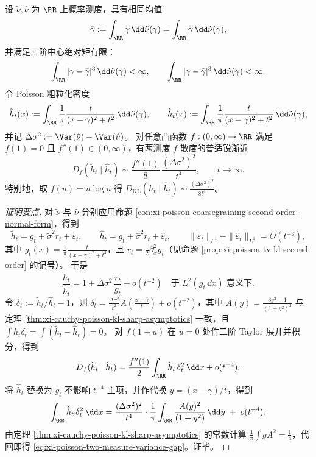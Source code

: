 \begin{theorem}\label{thm:xi-poisson-two-measure-variance-gap}
设 \(\tilde\nu,\hat\nu\) 为 \(\RR\) 上概率测度，具有相同均值
\[
\bar\gamma:=\int_{\RR}\gamma\,\dd\tilde\nu(\gamma)=\int_{\RR}\gamma\,\dd\hat\nu(\gamma),
\]
并满足三阶中心绝对矩有限：
\[
\int_{\RR}|\gamma-\bar\gamma|^3\,\dd\tilde\nu(\gamma)<\infty,
\qquad
\int_{\RR}|\gamma-\bar\gamma|^3\,\dd\hat\nu(\gamma)<\infty.
\]
令 Poisson 粗粒化密度
\[
\tilde h_t(x):=\int_{\RR}\frac{1}{\pi}\frac{t}{(x-\gamma)^2+t^2}\,\dd\tilde\nu(\gamma),
\qquad
\hat h_t(x):=\int_{\RR}\frac{1}{\pi}\frac{t}{(x-\gamma)^2+t^2}\,\dd\hat\nu(\gamma),
\]
并记
\(
\Delta\sigma^2:=\Var(\tilde\nu)-\Var(\hat\nu)
\)。
对任意凸函数 \(f:(0,\infty)\to\RR\) 满足 \(f(1)=0\) 且 \(f''(1)\in(0,\infty)\)，有两测度 \texorpdfstring{$f$}{f}-散度的普适锐渐近
\begin{equation}\label{eq:xi-poisson-two-measure-variance-gap}
\boxed{\;
D_f(\tilde h_t\mid \hat h_t)\sim \frac{f''(1)}{8}\,\frac{(\Delta\sigma^2)^2}{t^4},
\qquad t\to\infty.\;}
\end{equation}
特别地，取 \(f(u)=u\log u\) 得
\(
D_{\mathrm{KL}}(\tilde h_t\mid \hat h_t)\sim \frac{(\Delta\sigma^2)^2}{8t^4}
\)。
\end{theorem}
\begin{proof}[证明要点]
对 \(\tilde\nu\) 与 \(\hat\nu\) 分别应用命题 \ref{con:xi-poisson-coarsegraining-second-order-normal-form}，得到
\[
\tilde h_t=g_t+\tilde\sigma^2 r_t+\tilde\varepsilon_t,
\qquad
\hat h_t=g_t+\hat\sigma^2 r_t+\hat\varepsilon_t,
\qquad
\|\tilde\varepsilon_t\|_{L^1}+\|\hat\varepsilon_t\|_{L^1}=O(t^{-3}),
\]
其中 \(g_t(x)=\frac{1}{\pi}\frac{t}{(x-\bar\gamma)^2+t^2}\)，且 \(r_t=\tfrac12\partial_x^2 g_t\)（见命题 \ref{prop:xi-poisson-tv-kl-second-order} 的记号）。
于是
\[
\frac{\tilde h_t}{\hat h_t}
=1+\Delta\sigma^2\,\frac{r_t}{g_t}+o(t^{-2})
\quad\text{于 }L^2(g_t\,\dd x)\text{ 意义下}.
\]
令 \(\delta_t:=\tilde h_t/\hat h_t-1\)，则 \(\delta_t=\frac{\Delta\sigma^2}{t^2}A\!\left(\frac{x-\bar\gamma}{t}\right)+o(t^{-2})\)，其中
\(
A(y)=\frac{3y^2-1}{(1+y^2)^2}
\)
与定理 \ref{thm:xi-cauchy-poisson-kl-sharp-asymptotics} 一致，且 \(\int \hat h_t\delta_t=\int(\tilde h_t-\hat h_t)=0\)。
对 \(f(1+u)\) 在 \(u=0\) 处作二阶 Taylor 展开并积分，得到
\[
D_f(\tilde h_t\mid \hat h_t)
=\frac{f''(1)}{2}\int_{\RR}\hat h_t\,\delta_t^2\,\dd x+o(t^{-4}).
\]
将 \(\hat h_t\) 替换为 \(g_t\) 不影响 \(t^{-4}\) 主项，并作代换 \(y=(x-\bar\gamma)/t\)，得到
\[
\int_{\RR}\hat h_t\,\delta_t^2\,\dd x
=\frac{(\Delta\sigma^2)^2}{t^4}\cdot \frac{1}{\pi}\int_{\RR}\frac{A(y)^2}{(1+y^2)}\,\dd y
\;+\;o(t^{-4}).
\]
由定理 \ref{thm:xi-cauchy-poisson-kl-sharp-asymptotics} 的常数计算 \(\frac{1}{\pi}\int gA^2=\frac14\)，代回即得 \eqref{eq:xi-poisson-two-measure-variance-gap}。证毕。
\end{proof}

